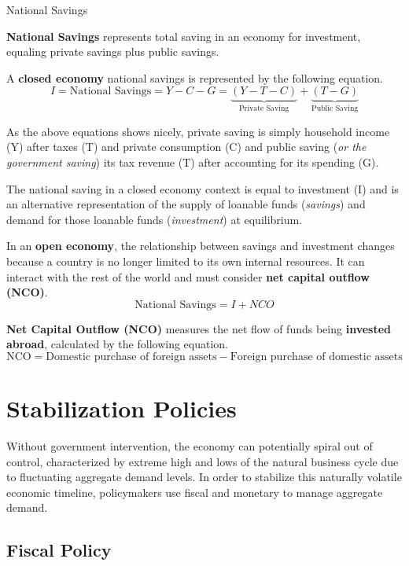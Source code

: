 \documentclass[10pt]{article}
\begin{document}
    \begin{core}{National Savings}

      \textbf{National Savings} represents total saving in an economy for investment, equaling private savings plus public savings.

      A \textbf{closed economy} national savings is represented by the following equation.
      \[
        I = \text{National Savings} = Y - C - G = \underbrace{(Y - T - C)}_{\text{Private Saving}} + \underbrace{(T - G)}_{\text{Public Saving}} 
      \]

      As the above equations shows nicely, private saving is simply household income (Y) after taxes (T) and private consumption (C) and public saving (\textit{or the government saving}) its tax revenue (T) after accounting for its spending (G). 

      The national saving in a closed economy context is equal to investment (I) and is an alternative representation of the supply of loanable funds (\textit{savings}) and demand for those loanable funds (\textit{investment}) at equilibrium.

      In an \textbf{open economy}, the relationship between savings and investment changes because a country is no longer limited to its own internal resources. It can interact with the rest of the world and must consider \textbf{net capital outflow (NCO)}.
      \[
        \text{National Savings} = I + NCO
      \]

      \textbf{Net Capital Outflow (NCO)} measures the net flow of funds being \textbf{invested abroad}, calculated by the following equation.
      \[
        \text{NCO} = \text{Domestic purchase of foreign assets} - \text{Foreign purchase of domestic assets}
      \]

    \end{core}

\section{Stabilization Policies}

  Without government intervention, the economy can potentially spiral out of control, characterized by extreme high and lows of the natural business cycle due to fluctuating aggregate demand levels. In order to stabilize this naturally volatile economic timeline, policymakers use fiscal and monetary to manage aggregate demand.

  \subsection{Fiscal Policy}
\end{document}
